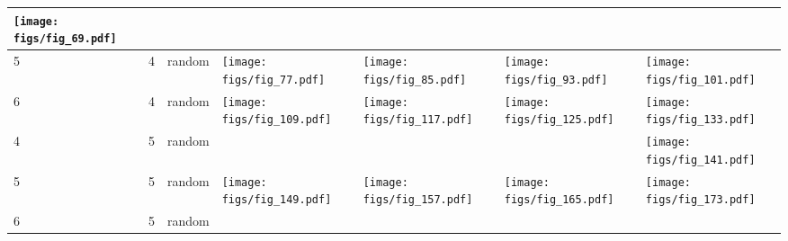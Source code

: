 \documentclass[oneside,canadian,landscape]{article}
\begin{document}
\begin{center}
\begin{longtable}{|l|l|l||l|l|l|l|}
\begin{minipage}{3.5cm}
\texttt{[image: figs/fig\_69.pdf]}
\end{minipage}
&\\ \hline
5&4&random&\begin{minipage}{3.5cm}
\texttt{[image: figs/fig\_77.pdf]}
\end{minipage}
&\begin{minipage}{3.5cm}
\texttt{[image: figs/fig\_85.pdf]}
\end{minipage}
&\begin{minipage}{3.5cm}
\texttt{[image: figs/fig\_93.pdf]}
\end{minipage}
&\begin{minipage}{3.5cm}
\texttt{[image: figs/fig\_101.pdf]}
\end{minipage}
\\ \hline
6&4&random&\begin{minipage}{3.5cm}
\texttt{[image: figs/fig\_109.pdf]}
\end{minipage}
&\begin{minipage}{3.5cm}
\texttt{[image: figs/fig\_117.pdf]}
\end{minipage}
&\begin{minipage}{3.5cm}
\texttt{[image: figs/fig\_125.pdf]}
\end{minipage}
&\begin{minipage}{3.5cm}
\texttt{[image: figs/fig\_133.pdf]}
\end{minipage}
\\ \hline
4&5&random&&&&\begin{minipage}{3.5cm}
\texttt{[image: figs/fig\_141.pdf]}
\end{minipage}
\\ \hline
5&5&random&\begin{minipage}{3.5cm}
\texttt{[image: figs/fig\_149.pdf]}
\end{minipage}
&\begin{minipage}{3.5cm}
\texttt{[image: figs/fig\_157.pdf]}
\end{minipage}
&\begin{minipage}{3.5cm}
\texttt{[image: figs/fig\_165.pdf]}
\end{minipage}
&\begin{minipage}{3.5cm}
\texttt{[image: figs/fig\_173.pdf]}
\end{minipage}
\\ \hline
6&5&random&&\begin{minipage}{3.5cm}

\end{minipage}
\end{longtable}
\end{center}
\end{document}
